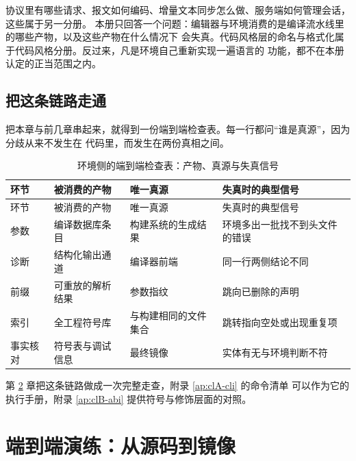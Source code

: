 \documentclass[12pt,a4paper,fontset=fandol]{ctexbook}
\begin{document}
\begin{note}[title={本册与语言服务分册的边界}]
协议里有哪些请求、报文如何编码、增量文本同步怎么做、服务端如何管理会话，这些属于另一分册。
本册只回答一个问题：编辑器与环境消费的是编译流水线里的哪些产物，以及这些产物在什么情况下
会失真。代码风格层的命名与格式化属于代码风格分册。反过来，凡是环境自己重新实现一遍语言的
功能，都不在本册认定的正当范围之内。
\end{note}

\section{把这条链路走通}\label{sec:cl14-endtoend}

把本章与前几章串起来，就得到一份端到端检查表。每一行都问“谁是真源”，因为分歧从来不发生在
代码里，而发生在两份真相之间。

\begin{longtable}{@{}>{\raggedright\arraybackslash}p{} >{\raggedright\arraybackslash}p{} >{\raggedright\arraybackslash}p{} >{\raggedright\arraybackslash}p{}@{}}
\caption{环境侧的端到端检查表：产物、真源与失真信号}\label{tab:cl14-checklist}\\
\toprule
环节 & 被消费的产物 & 唯一真源 & 失真时的典型信号 \\
\midrule
\endfirsthead
\toprule
环节 & 被消费的产物 & 唯一真源 & 失真时的典型信号 \\
\midrule
\endhead
\bottomrule
\endfoot
参数 & 编译数据库条目 & 构建系统的生成结果 & 环境多出一批找不到头文件的错误 \\
诊断 & 结构化输出通道 & 编译器前端 & 同一行两侧结论不同 \\
前缀 & 可重放的解析结果 & 参数指纹 & 跳向已删除的声明 \\
索引 & 全工程符号库 & 与构建相同的文件集合 & 跳转指向空处或出现重复项 \\
事实核对 & 符号表与调试信息 & 最终镜像 & 实体有无与环境判断不符 \\
\end{longtable}

第 \ref{ch:cl15-endtoend} 章把这条链路做成一次完整走查，附录 \ref{ap:clA-cli} 的命令清单
可以作为它的执行手册，附录 \ref{ap:clB-abi} 提供符号与修饰层面的对照。

\chapter{端到端演练：从源码到镜像}\label{ch:cl15-endtoend}
\end{document}

